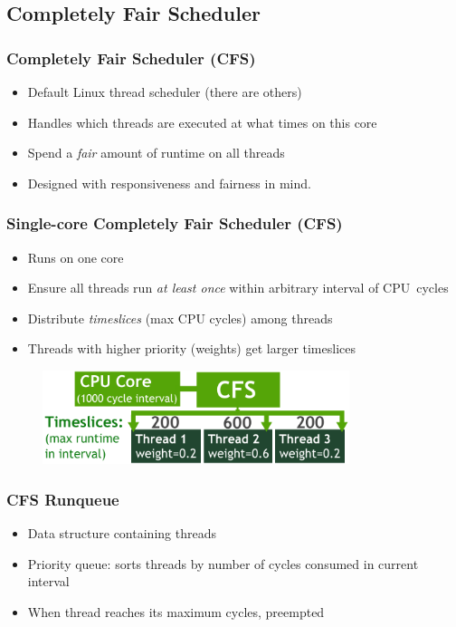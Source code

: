 \documentclass{beamer}
\newcommand{\linespace}{\vskip 0.25cm}
\begin{document}
\subsection[CFS]{Completely Fair Scheduler}
\begin{frame}
\frametitle{Completely Fair Scheduler (CFS)}

\begin{itemize}
\item Default Linux thread scheduler (there are others)
\item Handles which threads are executed at what times on this core
\item Spend a \emph{fair} amount of runtime on all threads
\linespace

\item Designed with responsiveness and fairness in mind.


\end{itemize}
\end{frame}


\begin{frame}
\frametitle{Single-core Completely Fair Scheduler (CFS)}

\begin{itemize}
\item Runs on one core
\item Ensure all threads run \emph{at least once} within arbitrary interval of CPU~cycles
\item Distribute \emph{timeslices} (max CPU cycles) among threads
\item Threads with higher priority (weights) get larger timeslices

\end{itemize}

\begin{figure}
		\includegraphics[width=0.8\textwidth]{Illustrations/CFS}
		\label{fig:cfs}
\end{figure}

\linespace

\end{frame}

\begin{frame}
\frametitle{CFS Runqueue}

\begin{itemize}
	\item Data structure containing threads
	\item Priority queue: sorts threads by number of cycles consumed in current interval
	\item When thread reaches its maximum cycles, preempted
\end{itemize}

\end{frame}
\end{document}
